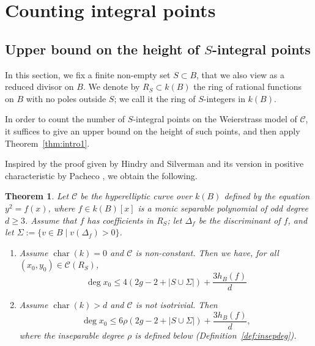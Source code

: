 \documentclass[11pt]{article}
\theoremstyle{plain}
\newtheorem{theorem}{Theorem}[section]
\theoremstyle{definition}
\DeclareMathOperator{\car}{char}
\begin{document}

\section{Counting integral points}
\label{section3}


\subsection{Upper bound on the height of $S$-integral points}
\label{sec:intpointsheightbound}

In this section, we fix a finite non-empty set $S\subset B$, that we also view as a reduced divisor on $B$. We denote by $R_S\subset k(B)$ the ring of rational functions on $B$ with no poles outside $S$; we call it the ring of $S$-integers in $k(B)$. 


In order to count the number of $S$-integral points on the Weierstrass model of $\mathcal{C}$, it suffices to give an upper bound on the height of such points, and then apply Theorem~\ref{thm:intro1}.


Inspired by the proof given by Hindry and Silverman \cite[Proposition~8.2]{HS} and its version in positive characteristic by Pacheco \cite{pacheco98}, we obtain the following.

\begin{theorem}
\label{thm:naiveheightbound}
Let $\mathcal{C}$ be the hyperelliptic curve over $k(B)$ defined by the equation $y^2=f(x)$, where $f \in k(B)[x]$ is a monic separable polynomial of odd degree $d\geq 3$.
Assume that $f$ has coefficients in $R_S$; let $\Delta_f$ be the discriminant of $f$, and let $\Sigma :=\{v\in B \mid v(\Delta_f) > 0\}$.
\begin{enumerate}
\item Assume $\car(k)=0$ and $\mathcal{C}$ is non-constant. Then we have, for all $(x_0,y_0)\in \mathcal{C}(R_S)$,
$$
\deg{x_0} \leq 4(2g-2+|S\cup \Sigma|) + \frac{3h_B(f)}{d}
$$
\item Assume $\car(k)>d$ and $\mathcal{C}$ is not isotrivial. Then
$$
\deg{x_0} \leq 6\rho(2g-2+|S\cup \Sigma|) + \frac{3h_B(f)}{d},
$$
where the inseparable degree $\rho$ is defined below (Definition~\ref{def:insepdeg}).
\end{enumerate}
\end{theorem}
\end{document}
